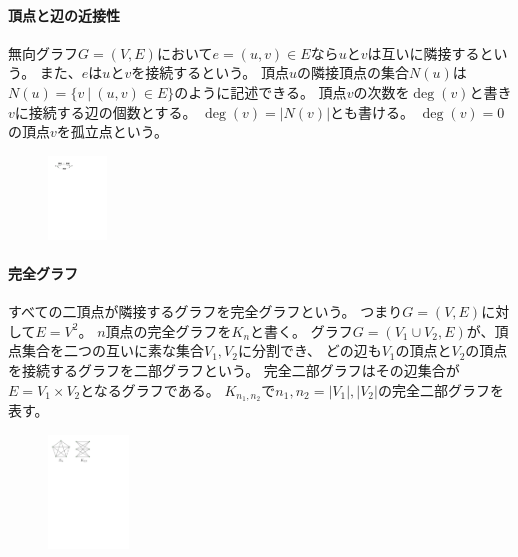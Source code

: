 \begin{paracol}{2}
\paragraph{頂点と辺の近接性}
無向グラフ$G=(V, E)$において$e=(u, v)\in E$なら$u$と$v$は互いに隣接するという。
また、$e$は$u$と$v$を接続するという。
頂点$u$の隣接頂点の集合$N(u)$は
$N(u) = \{v ~|~ (u, v) \in E\}$のように記述できる。
頂点$v$の次数を$\deg(v)$と書き$v$に接続する辺の個数とする。
$\deg(v) = |N(v)|$とも書ける。
$\deg(v)=0$の頂点$v$を孤立点という。

\switchcolumn
\vspace{1.0\intextsep}
\begin{figure}[ht]
\centering
\includegraphics[width=0.14\textwidth]{figures/neighbors.pdf}
\end{figure}
\end{paracol}


\begin{paracol}{2}
\paragraph{完全グラフ}
すべての二頂点が隣接するグラフを完全グラフという。
つまり$G=(V, E)$に対して$E=V^2$。
$n$頂点の完全グラフを$K_n$と書く。
グラフ$G=(V_1 \cup V_2, E)$が、頂点集合を二つの互いに素な集合$V_1, V_2$に分割でき、
どの辺も$V_1$の頂点と$V_2$の頂点を接続するグラフを二部グラフという。
完全二部グラフはその辺集合が$E = V_1 \times V_2$となるグラフである。
$K_{n_1, n_2}$で$n_1, n_2 = |V_1|, |V_2|$の完全二部グラフを表す。
\switchcolumn
\vspace{0.5\intextsep}
\begin{figure}[ht]
\centering
\includegraphics[width=0.19\textwidth]{figures/complete_graphs.pdf}
\end{figure}
\end{paracol}





